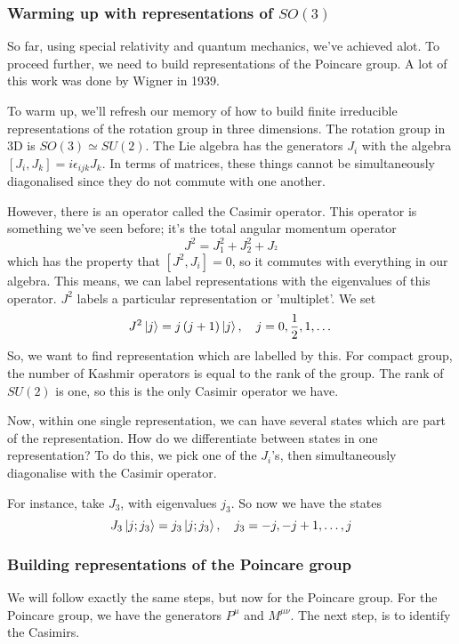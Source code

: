 \documentclass[11pt, oneside]{article}   	%
\theoremstyle{slanted}
\begin{document}
\subsubsection{Warming up with representations of $ SO ( 3 )  $ }
So far, using 
special relativity and quantum mechanics, 
we've achieved alot. To proceed further, 
we need to build representations of the Poincare group. 
A lot of this work was done by Wigner in 1939. 

To warm up, we'll refresh our memory 
of how to build finite irreducible representations of the rotation group in three dimensions. 
The rotation group in 3D is 
$ SO ( 3 ) \simeq SU (  2 )  $. 
The Lie algebra has the generators $ J _ i $
with the algebra $ \left[  J _ i , J _ k  \right]  = i \epsilon _{ ijk } J _ k  $. 
In terms of matrices, 
these things cannot be simultaneously diagonalised 
since they do not commute with one another. 

However, there is an operator called the
Casimir operator. 
This operator is something we've seen before; 
it's the total angular momentum operator \[ 
J ^ 2  = J_ 1 ^ 2 + J _ 2 ^ 2 + J _ ^ 2 \] 
which has the property that  $ \left[  J ^ 2 , J _ i  \right]   = 0 $,
so it commutes with everything in our algebra. 
This means, we can label representations with 
the eigenvalues of this operator. 
$ J ^ 2 $ labels a particular representation or 'multiplet'. 
We set 
\[
J ^ 2 \ket{ j }  = j \left( j + 1   \right)  \ket{ j } , \quad j = 0 , \frac{1}{2 }, 1 , \dots 
\] So, we want to find representation which are labelled by this. 
For compact group, the number of Kashmir operators 
is equal to the rank of the group. The rank 
of $ SU(2 ) $ is one, so this is the 
only Casimir operator we have. 

Now, within one single representation, we can have 
several states which are part of the representation.
How do we differentiate between states in 
one representation? To do this, we pick one of the $ J  _i   $'s, 
then simultaneously diagonalise with the 
Casimir operator. 

For instance, take $ J _ 3 $, with eigenvalues 
$ j _ 3 $. 
So now we have the states 
\[
J _ 3  \ket{ j ;  j _ 3 }  = j _ 3 \ket{ j ;  j _ 3 } , \quad j _ 3 = - j ,  - j + 1 , \dots , j 
\] 

\subsubsection{Building representations of the Poincare group}
We will follow exactly the same steps, 
but now for the Poincare group. 
For the Poincare group, 
we have the generators $ P ^ \mu $ and $ M ^{ \mu \nu } $. 
The next step, is to identify the 
Casimirs. 
\end{document}
